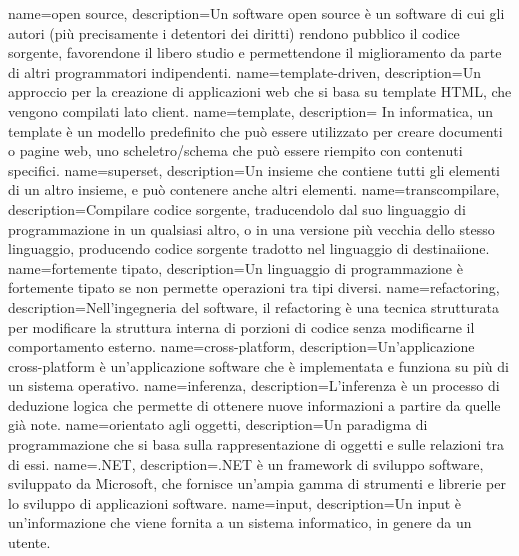 {
    name=open source,
    description={Un software open source è un software di cui gli autori (più precisamente i detentori dei diritti) rendono pubblico il codice sorgente, favorendone il libero studio e permettendone il miglioramento da parte di altri programmatori indipendenti.}
}
{
    name=template-driven,
    description={Un approccio per la creazione di applicazioni web che si basa su template HTML, che vengono compilati lato client.}
}
{
    name=template,
    description={
        In informatica, un template è un modello predefinito che può essere utilizzato per creare documenti o pagine web, uno scheletro/schema che può essere riempito con contenuti specifici.
        }
}
{
    name=superset,
    description={Un insieme che contiene tutti gli elementi di un altro insieme, e può contenere anche altri elementi.}
}
{
    name=transcompilare,
    description={Compilare codice sorgente, traducendolo dal suo linguaggio di programmazione in un qualsiasi altro, o in una versione più vecchia dello stesso linguaggio, producendo codice sorgente tradotto nel linguaggio di destinaiione.}
}
{
    name=fortemente tipato,
    description={Un linguaggio di programmazione è fortemente tipato se non permette operazioni tra tipi diversi.}
}
{
    name=refactoring,
    description={Nell'ingegneria del software, il refactoring è una tecnica strutturata per modificare la struttura interna di porzioni di codice senza modificarne il comportamento esterno.}
}
{
    name=cross-platform,
    description={Un'applicazione cross-platform è un'applicazione software che è implementata e funziona su più di un sistema operativo.}
}
{
    name=inferenza,
    description={L'inferenza è un processo di deduzione logica che permette di ottenere nuove informazioni a partire da quelle già note.}
}
{
    name=orientato agli oggetti,
    description={Un paradigma di programmazione che si basa sulla rappresentazione di oggetti e sulle relazioni tra di essi.}
}
{
    name=.NET,
    description={.NET è un framework di sviluppo software, sviluppato da Microsoft, che fornisce un'ampia gamma di strumenti e librerie per lo sviluppo di applicazioni software.}
}
{
    name=input,
    description={Un input è un'informazione che viene fornita a un sistema informatico, in genere da un utente.}
}
